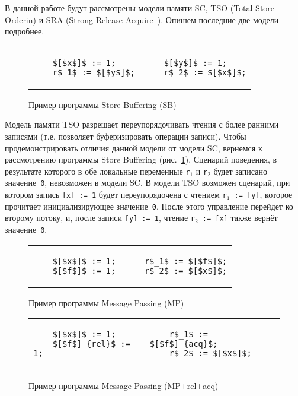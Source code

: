 В данной работе будут рассмотрены модели памяти 
SC, TSO (Total Store Orderin) и SRA (Strong Release-Acquire~\cite{lahav2016taming}).
Опишем последние две модели подробнее.

\begin{figure}[htp]
\centering
    \begin{tabular}{l|@{\hskip 5pt}|@{\hskip -15pt}l}
    \begin{lstlisting}
    $[$x$]$ := 1;
    r$_1$ := $[$y$]$;
    \end{lstlisting}
    &
    \begin{lstlisting}
    $[$y$]$ := 1;
    r$_2$ := $[$x$]$;
    \end{lstlisting}
    \\
    \end{tabular}
    \caption{Пример программы Store Buffering (SB)}
    \label{lst:sb-ex-2}
\end{figure}

Модель памяти TSO разрешает 
переупорядочивать чтения с более ранними записями
(т.е. позволяет буферизировать операции записи).
Чтобы продемонстрировать отличия данной модели 
от модели SC, вернемся к рассмотрению программы Store Buffering (рис.~\ref{lst:sb-ex-2}).
Сценарий поведения, в результате которого в обе локальные переменные 
\texttt{r$_1$} и \texttt{r$_2$} будет записано значение~\texttt{0}, 
невозможен в модели SC.
В модели TSO возможен сценарий, 
при котором запись \texttt{[x] := 1} будет переупорядочена 
с чтением \texttt{r$_1$ := [y]}, которое прочитает инициализирующее значение~\texttt{0}.
После этого управление перейдет ко второму потоку, 
и, после записи \texttt{[y] := 1}, чтение \texttt{r$_2$ := [x]} также вернёт значение~\texttt{0}.

\begin{figure}[htp]
\centering
    \begin{tabular}{l|@{\hskip 5pt}|@{\hskip -15pt}l}
    \begin{lstlisting}
    $[$x$]$ := 1;
    $[$f$]$ := 1;
    \end{lstlisting}
    &
    \begin{lstlisting}
    r$_1$ := $[$f$]$;
    r$_2$ := $[$x$]$;
    \end{lstlisting}
    \\
    \end{tabular}
    \caption{Пример программы Message Passing (MP)}
    \label{lst:mp-ex-1}
\end{figure}

\begin{figure}[htp]
\centering
    \begin{tabular}{l|@{\hskip 5pt}|@{\hskip -15pt}l}
    \begin{lstlisting}
    $[$x$]$ := 1;
    $[$f$]_{rel}$ := 1;
    \end{lstlisting}
    &
    \begin{lstlisting}
    r$_1$ := $[$f$]_{acq}$;
    r$_2$ := $[$x$]$;
    \end{lstlisting}
    \\
    \end{tabular}
    \caption{Пример программы Message Passing (MP+rel+acq)}
    \label{lst:mp-ex-ra}
\end{figure}


